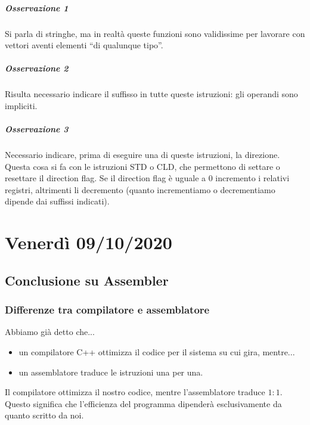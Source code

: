 \documentclass[11pt]{report}
\begin{document}
\paragraph{Osservazione 1} Si parla di stringhe, ma in realtà queste funzioni sono validissime per lavorare con vettori aventi elementi ``di qualunque tipo''.
\paragraph{Osservazione 2} Risulta necessario indicare il suffisso in tutte queste istruzioni: gli operandi sono impliciti.
\paragraph{Osservazione 3} Necessario indicare, prima di eseguire una di queste istruzioni, la direzione. Questa cosa si fa con le istruzioni STD o CLD, che permettono di settare o resettare il direction flag. Se il direction flag è uguale a 0 incremento i relativi registri, altrimenti li decremento (quanto incrementiamo o decrementiamo dipende dai suffissi indicati).
\chapter{Venerdì 09/10/2020}
\section{Conclusione su Assembler}
\subsection{Differenze tra compilatore e assemblatore}
Abbiamo già detto che...
\begin{itemize}
\item un compilatore C++ ottimizza il codice per il sistema su cui gira, mentre...
\item un assemblatore traduce le istruzioni una per una.
\end{itemize}
Il compilatore ottimizza il nostro codice, mentre l'assemblatore traduce $1:1$. Questo significa che l'efficienza del programma dipenderà esclusivamente da quanto scritto da noi.
\end{document}
